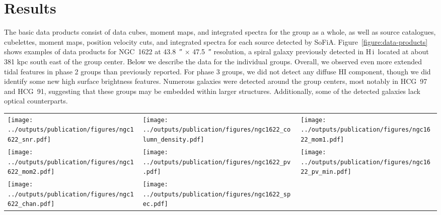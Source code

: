 \documentclass{aa}
\newcommand{\HI}{H\,{\sc i}}
\begin{document}
\section{Results}\label{results}
The basic data products consist of data cubes, moment maps, and integrated spectra for the group as a whole, as well as source catalogues, cubelettes, 
moment maps, position velocity cuts, and integrated spectra for each source detected by SoFiA. Figure~\ref{figure:data-products} shows examples of data products for NGC~1622 at \SI{43.8}{\arcsecond} $\times$ \SI{47.5}{\arcsecond} resolution, a spiral galaxy previously detected in \HI\ located at about 381 kpc south east of the group center. Below we describe the data 
for the individual groups. Overall, we observed even more extended tidal features in phase 2 groups than previously reported. For phase 3 groups, we did not detect any diffuse HI component, though we did identify some new high surface brightness features. Numerous galaxies were detected around the group centers, most notably in HCG~97 and HCG~91, 
suggesting that these groups may be embedded within larger structures. Additionally, some of the detected galaxies lack optical counterparts. 
\begin{figure*}
\setlength{\tabcolsep}{0pt}
\begin{tabular}{lll}
    \texttt{[image: ../outputs/publication/figures/ngc1622\_snr.pdf]}&
    \texttt{[image: ../outputs/publication/figures/ngc1622\_column\_density.pdf]}&
    \texttt{[image: ../outputs/publication/figures/ngc1622\_mom1.pdf]}\\  
    \texttt{[image: ../outputs/publication/figures/ngc1622\_mom2.pdf]}&  
    \texttt{[image: ../outputs/publication/figures/ngc1622\_pv.pdf]}&
    \texttt{[image: ../outputs/publication/figures/ngc1622\_pv\_min.pdf]}\\  
    \texttt{[image: ../outputs/publication/figures/ngc1622\_chan.pdf]}&  
    \texttt{[image: ../outputs/publication/figures/ngc1622\_spec.pdf]}  
  \end{tabular}
  \caption{Example SoFiA data products for NGC~1622, a spiral galaxy previously detected in \HI\ located at about 381 kpc south east of the group center. 
	From top left to bottom right panel: signal-to-noise ratio of each individual pixels, column density map and R-band DeCaLS 
  DR10 \citep{2019AJ....157..168D} optical image \textemdash~the contour levels are 
  (\SI{5.70e+18}{}, \SI{1.140e+19}{}, \SI{2.28e+19}{}, \SI{4.56e+19}{}, \SI{9.12e+19}{}, \SI{1.82e+20}{}, \SI{3.65e+20}{}, \SI{7.30e+20}{}) $\mathrm{cm^{-2}}$, first moment map (velocity field), second moment map, major axis position velocity diagram, minor axis position velocity diagram, 
  an example channel map, and integrated spectrum from a data cube where the noise has been masked. 
  The ellipse at the bottom left corner of each plot shows the beam, \SI{43.8}{\arcsecond} $\times$ \SI{47.5}{\arcsecond}.}  
  \label{figure:data-products}
 \end{figure*}
\end{document}
